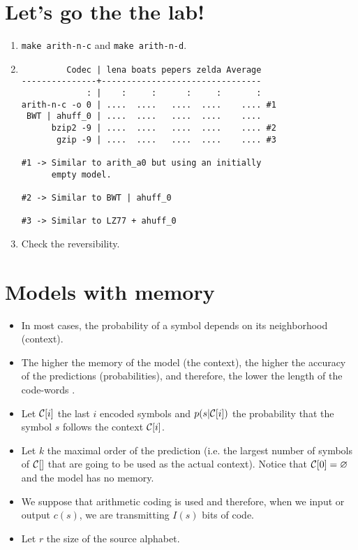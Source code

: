 \section*{Let's go the the lab!}
\begin{enumerate}
\item \texttt{make arith-n-c} and \texttt{make arith-n-d}.
\item
\begin{verbatim}
         Codec | lena boats pepers zelda Average
---------------+--------------------------------
             : |    :     :      :     :       :
arith-n-c -o 0 | ....  ....   ....  ....    .... #1
 BWT | ahuff_0 | ....  ....   ....  ....    ....
      bzip2 -9 | ....  ....   ....  ....    .... #2
       gzip -9 | ....  ....   ....  ....    .... #3

#1 -> Similar to arith_a0 but using an initially
      empty model.

#2 -> Similar to BWT | ahuff_0

#3 -> Similar to LZ77 + ahuff_0
\end{verbatim}
\item Check the reversibility.
\end{enumerate}

\section{Models with memory}
\begin{itemize}
\item In most cases, the probability of a symbol depends on its
  neighborhood (context).
\item The higher the memory of the model (the context), the higher the
  accuracy of the predictions (probabilities), and therefore, the
  lower the length of the code-words \cite{cleary1984data}.
\item Let ${\cal C}[i]$ the last $i$ encoded symbols and $p(s|{\cal C}[i])$ the
  probability that the symbol $s$ follows the context ${\cal C}[i]$.
\item Let $k$ the maximal order of the prediction (i.e. the largest
  number of symbols of ${\cal C}[]$ that are going to be used as the
  actual context). Notice that ${\cal C}[0]=\varnothing$ and the model
  has no memory.
\item We suppose that arithmetic coding is used and therefore, when we
  input or output $c(s)$, we are transmitting $I(s)$ bits of code.
\item Let $r$ the size of the source alphabet.
\end{itemize}

